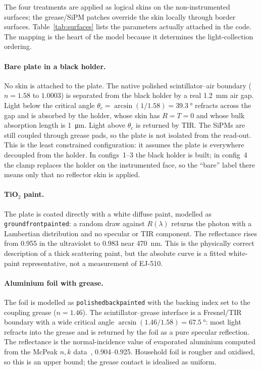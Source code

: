 \documentclass[preprint,12pt]{elsarticle}
\begin{document}
The four treatments are applied as logical skins on the non-instrumented
surfaces; the grease/SiPM patches override the skin locally through border
surfaces. Table~\ref{tab:surfaces} lists the parameters actually attached in the
code. The mapping is the heart of the model because it determines the
light-collection ordering.

\paragraph{Bare plate in a black holder.}
No skin is attached to the plate. The native polished scintillator--air boundary
($n=1.58$ to $1.0003$) is separated from the black holder by a real
\SI{1.2}{\milli\meter} air gap. Light below the critical angle
$\theta_c=\arcsin(1/1.58)=\SI{39.3}{\degree}$ refracts across the gap and is
absorbed by the holder, whose skin has $R=T=0$ and whose bulk absorption length
is \SI{1}{\micro\meter}. Light above $\theta_c$ is returned by TIR. The SiPMs
are still coupled through grease pads, so the plate is not isolated from the
read-out. This is the least constrained configuration: it assumes the plate is
everywhere decoupled from the holder. In configs~1--3 the black holder is built;
in config~4 the clamp replaces the holder on the instrumented face, so the
``bare'' label there means only that no reflector skin is applied.

\paragraph{TiO$_2$ paint.}
The plate is coated directly with a white diffuse paint, modelled as
\texttt{groundfrontpainted}: a random draw against $R(\lambda)$ returns the
photon with a Lambertian distribution and no specular or TIR component. The
reflectance rises from \num{0.955} in the ultraviolet to \num{0.983} near
\SI{470}{\nano\meter}. This is the physically correct description of a thick
scattering paint, but the absolute curve is a fitted white-paint
representative, not a measurement of EJ-510.

\paragraph{Aluminium foil with grease.}
The foil is modelled as \texttt{polishedbackpainted} with the backing index set
to the coupling grease ($n=1.46$). The scintillator--grease interface is a
Fresnel/TIR boundary with a wide critical angle
$\arcsin(1.46/1.58)=\SI{67.5}{\degree}$: most light refracts into the grease and
is returned by the foil as a pure specular reflection. The reflectance is the
normal-incidence value of evaporated aluminium computed from the McPeak
$n,k$ data~\cite{McPeak2015}, \num{0.904}--\num{0.925}. Household foil is
rougher and oxidised, so this is an upper bound; the grease contact is idealised
as uniform.
\end{document}
